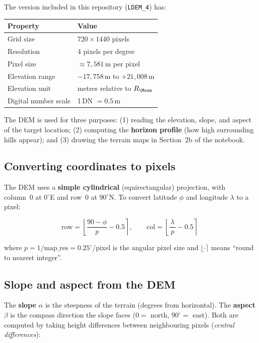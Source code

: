 \documentclass[12pt, a4paper]{article}
\begin{document}
The version included in this repository (\texttt{LDEM\_4}) has:

\begin{center}
\begin{tabular}{ll}
\toprule
Property & Value \\
\midrule
Grid size       & $720 \times 1440$ pixels \\
Resolution      & 4 pixels per degree \\
Pixel size      & $\approx 7{,}581$\,m per pixel \\
Elevation range & $-17{,}758$\,m to $+21{,}008$\,m \\
Elevation unit  & metres relative to $R_{\Moon}$ \\
Digital number scale & 1\,DN $= 0.5$\,m \\
\bottomrule
\end{tabular}
\end{center}

The DEM is used for three purposes:
(1) reading the elevation, slope, and aspect of the target location;
(2) computing the \textbf{horizon profile} (how high surrounding
hills appear); and
(3) drawing the terrain maps in Section~2b of the notebook.

\subsection{Converting coordinates to pixels}

The DEM uses a \textbf{simple cylindrical} (equirectangular)
projection, with column~0 at $0^{\circ}$E and row~0 at $90^{\circ}$N.
To convert latitude $\phi$ and longitude $\lambda$ to a pixel:

\begin{equation}
  \text{row} =
    \left\lfloor \frac{90 - \phi}{\,p\,} - 0.5 \right\rceil,
  \qquad
  \text{col} =
    \left\lfloor \frac{\lambda}{\,p\,} - 0.5 \right\rceil
  \label{eq:pixel}
\end{equation}

where $p = 1/\text{map\_res} = 0.25^{\circ}$/pixel is the angular
pixel size and $\lfloor\cdot\rceil$ means ``round to nearest integer''.

\subsection{Slope and aspect from the DEM}

The \textbf{slope} $\alpha$ is the steepness of the terrain
(degrees from horizontal).
The \textbf{aspect} $\beta$ is the compass direction the slope
faces ($0 = $ north, $90^{\circ} = $ east).
Both are computed by taking height differences between neighbouring
pixels (\emph{central differences}):
\end{document}
